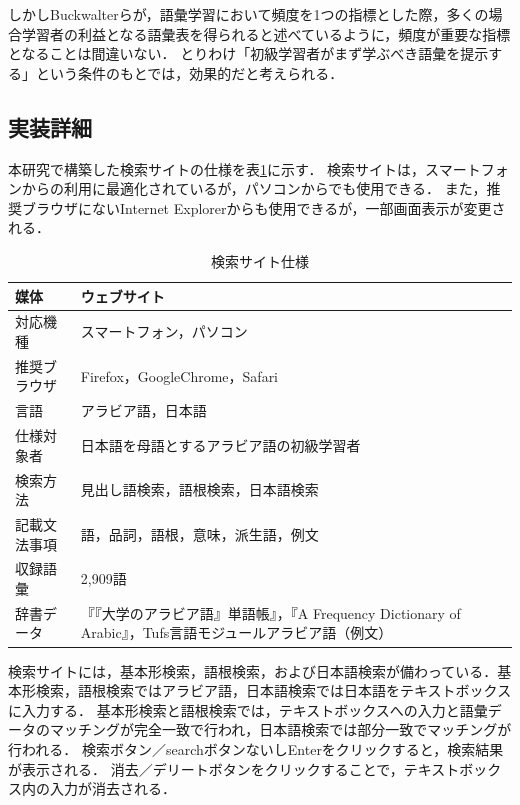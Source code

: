 \documentclass[technicalreport]{ieicej}
\begin{document}
しかしBuckwalterら\cite{buckwalter2009}が，語彙学習において頻度を1つの指標とした際，多くの場合学習者の利益となる語彙表を得られると述べているように，頻度が重要な指標となることは間違いない．
とりわけ「初級学習者がまず学ぶべき語彙を提示する」という条件のもとでは，効果的だと考えられる．

\subsection{実装詳細}
本研究で構築した検索サイトの仕様を表\ref{table:website}に示す．
検索サイトは，スマートフォンからの利用に最適化されているが，パソコンからでも使用できる．
また，推奨ブラウザにないInternet Explorerからも使用できるが，一部画面表示が変更される．

\begin{table}[ht]
\begin{center}
\begin{tabular}{l|p{6 cm}}
   媒体 & ウェブサイト\\
  \hline
    対応機種 & スマートフォン，パソコン\\
    推奨ブラウザ & Firefox，GoogleChrome，Safari\\
    言語 &  アラビア語，日本語\\
    仕様対象者 &  日本語を母語とするアラビア語の初級学習者\\
    検索方法 &  見出し語検索，語根検索，日本語検索\\
    記載文法事項 &  語，品詞，語根，意味，派生語，例文\\
    収録語彙 &  2,909語\\
    辞書データ &  『『大学のアラビア語』単語帳』，『A Frequency Dictionary of Arabic』，Tufs言語モジュールアラビア語（例文）\\
\hline
\end{tabular}
\caption{検索サイト仕様}
\label{table:website}
\end{center}
\end{table}

検索サイトには，基本形検索，語根検索，および日本語検索が備わっている．基本形検索，語根検索ではアラビア語，日本語検索では日本語をテキストボックスに入力する．
基本形検索と語根検索では，テキストボックスへの入力と語彙データのマッチングが完全一致で行われ，日本語検索では部分一致でマッチングが行われる．
検索ボタン／searchボタンないしEnterをクリックすると，検索結果が表示される．
消去／デリートボタンをクリックすることで，テキストボックス内の入力が消去される．
\end{document}

